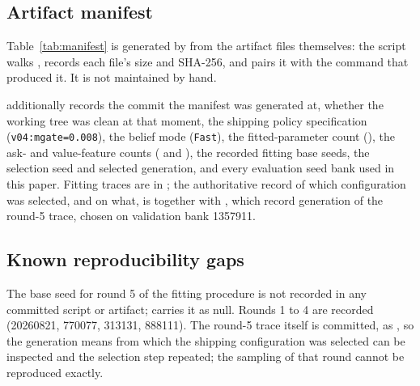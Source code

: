 \subsection{Artifact manifest}
\label{app:repro-manifest}

Table~\ref{tab:manifest} is generated by  from
the artifact files themselves: the script walks
, records each file's size and SHA-256, and pairs it
with the command that produced it. It is not maintained by hand.

\begingroup
\small
{}
\label{tab:manifest}

\endgroup

 additionally records the commit the
manifest was generated at, whether the working tree was clean at that moment,
the shipping policy specification (\texttt{v04:mgate=0.008}), the belief mode
(\texttt{Fast}), the fitted-parameter count (\numParams{}), the ask- and
value-feature counts (\numAskFeats{} and \numValueFeats{}), the recorded fitting
base seeds, the selection seed and selected generation, and every evaluation
seed bank used in this paper. Fitting traces are in
; the authoritative record of which configuration was
selected, and on what, is  together with
, which record generation
\numSelectedGen{} of the round-5 trace, chosen on validation bank 1357911.

\subsection{Known reproducibility gaps}
\label{app:repro-gaps}

The base seed for round 5 of the fitting procedure is not recorded in any
committed script or artifact;  carries
it as null. Rounds 1 to 4 are recorded (20260821, 770077, 313131, 888111). The
round-5 trace itself is committed, as
, so the generation means from which
the shipping configuration was selected can be inspected and the selection step
repeated; the sampling of that round cannot be reproduced exactly.

